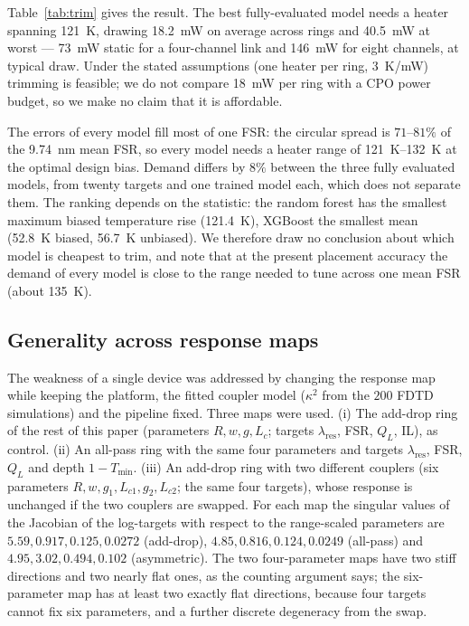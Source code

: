 \documentclass[11pt]{article}
\newcommand{\lres}{\lambda_{\mathrm{res}}}
\newcommand{\QL}{Q_L}
\begin{document}
Table~\ref{tab:trim} gives the result. The best fully-evaluated model needs a
heater spanning \SI{121}{K}, drawing \SI{18.2}{mW} on average across rings
and \SI{40.5}{mW} at worst --- \SI{73}{mW} static for a four-channel link and
\SI{146}{mW} for eight channels, at typical draw. Under the stated assumptions (one heater per ring, \SI{3}{K/mW}) trimming is feasible; we do not compare \SI{18}{mW} per ring with a CPO power budget, so we make no claim that it is affordable.

The errors of every model fill most of one FSR: the circular spread is $71$--$81\%$ of the \SI{9.74}{nm} mean FSR, so every model needs a heater range of \SIrange{121}{132}{K} at the optimal design bias. Demand differs by $8\%$ between the three fully evaluated models, from twenty targets and one trained model each, which does not separate them. The ranking depends on the statistic: the random forest has the smallest maximum biased temperature rise (\SI{121.4}{K}), XGBoost the smallest mean (\SI{52.8}{K} biased, \SI{56.7}{K} unbiased). We therefore draw no conclusion about which model is cheapest to trim, and note that at the present placement accuracy the demand of every model is close to the range needed to tune across one mean FSR (about \SI{135}{K}).

\subsection{Generality across response maps}
\label{sec:gen}

The weakness of a single device was addressed by changing the response map while keeping the platform, the fitted coupler model ($\kappa^2$ from the $200$ FDTD simulations) and the pipeline fixed. Three maps were used. (i) The add-drop ring of the rest of this paper (parameters $R,w,g,L_c$; targets $\lres$, FSR, $\QL$, IL), as control. (ii) An all-pass ring with the same four parameters and targets $\lres$, FSR, $\QL$ and depth $1-T_{\min}$. (iii) An add-drop ring with two different couplers (six parameters $R,w,g_1,L_{c1},g_2,L_{c2}$; the same four targets), whose response is unchanged if the two couplers are swapped. For each map the singular values of the Jacobian of the log-targets with respect to the range-scaled parameters are $5.59, 0.917, 0.125, 0.0272$ (add-drop), $4.85, 0.816, 0.124, 0.0249$ (all-pass) and $4.95, 3.02, 0.494, 0.102$ (asymmetric). The two four-parameter maps have two stiff directions and two nearly flat ones, as the counting argument says; the six-parameter map has at least two exactly flat directions, because four targets cannot fix six parameters, and a further discrete degeneracy from the swap.
\end{document}
